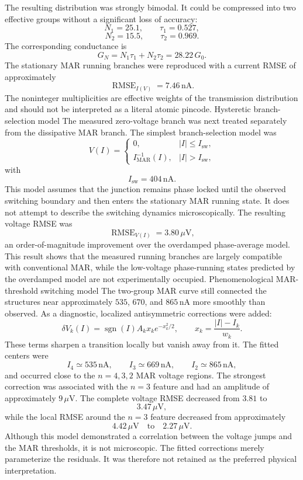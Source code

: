The resulting distribution was strongly bimodal. It could be compressed into two effective groups without a significant loss of accuracy:
\[
N_1=25.1,\qquad \tau_1=0.527,
\]\[
N_2=15.5,\qquad \tau_2=0.969.
\]The corresponding conductance is
\[
G_N
=
N_1\tau_1+N_2\tau_2
=
28.22\,G_0.
\]The stationary MAR running branches were reproduced with a current RMSE of approximately
\[
\operatorname{RMSE}_{I(V)}
=
7.46\,\mathrm{nA}.
\]The noninteger multiplicities are effective weights of the transmission distribution and should not be interpreted as a literal atomic pincode.
Hysteretic branch-selection model
The measured zero-voltage branch was next treated separately from the dissipative MAR branch. The simplest branch-selection model was
\[
V(I)=
\begin{cases}
0,
&
|I|\le I_{\mathrm{sw}},\\[4pt]
I_{\mathrm{MAR}}^{-1}(I),
&
|I|>I_{\mathrm{sw}},
\end{cases}
\]with
\[
I_{\mathrm{sw}}=404\,\mathrm{nA}.
\]This model assumes that the junction remains phase locked until the observed switching boundary and then enters the stationary MAR running state. It does not attempt to describe the switching dynamics microscopically.
The resulting voltage RMSE was
\[
\operatorname{RMSE}_{V(I)}
=
3.80\,\mu\mathrm V,
\]an order-of-magnitude improvement over the overdamped phase-average model. This result shows that the measured running branches are largely compatible with conventional MAR, while the low-voltage phase-running states predicted by the overdamped model are not experimentally occupied.
Phenomenological MAR-threshold switching model
The two-group MAR curve still connected the structures near approximately \(535\), \(670\), and \(865\,\mathrm{nA}\) more smoothly than observed. As a diagnostic, localized antisymmetric corrections were added:
\[
\delta V_k(I)
=
\operatorname{sgn}(I)
A_kx_k e^{-x_k^2/2},
\qquad
x_k=\frac{|I|-I_k}{w_k}.
\]These terms sharpen a transition locally but vanish away from it. The fitted centers were
\[
I_4\simeq535\,\mathrm{nA},
\qquad
I_3\simeq669\,\mathrm{nA},
\qquad
I_2\simeq865\,\mathrm{nA},
\]and occurred close to the \(n=4,3,2\) MAR voltage regions. The strongest correction was associated with the \(n=3\) feature and had an amplitude of approximately \(9\,\mu\mathrm V\).
The complete voltage RMSE decreased from \(3.81\) to
\[
3.47\,\mu\mathrm V,
\]while the local RMSE around the \(n=3\) feature decreased from approximately
\[
4.42\,\mu\mathrm V
\quad\text{to}\quad
2.27\,\mu\mathrm V.
\]Although this model demonstrated a correlation between the voltage jumps and the MAR thresholds, it is not microscopic. The fitted corrections merely parameterize the residuals. It was therefore not retained as the preferred physical interpretation.
